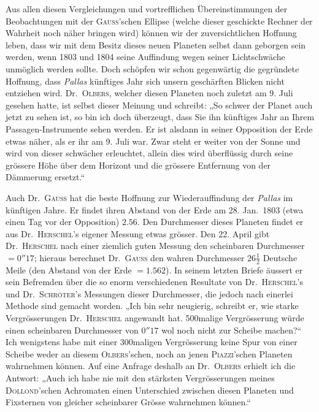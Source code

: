 Aus allen diesen Vergleichungen und vortrefflichen Übereinstimmungen der Beobachtungen mit der \textsc{Gauss}'schen Ellipse (welche dieser geschickte Rechner der Wahrheit noch näher bringen wird) können wir der zuversichtlichen Hoffnung leben, dass wir mit dem Besitz dieses neuen Planeten selbst dann geborgen sein werden, wenn 1803 und 1804 seine Auffindung wegen seiner Lichtschwäche unmöglich werden sollte. Doch schöpfen wir schon gegenwärtig die gegründete Hoffnung, dass \textit{Pallas} künftiges Jahr sich unsern geschärften Blicken nicht entziehen wird. Dr.\ \textsc{Olbers}, welcher diesen Planeten noch zuletzt am 9. Juli gesehen hatte, ist selbst dieser Meinung und schreibt: „So schwer der Planet auch jetzt zu sehen ist, so bin ich doch überzeugt, dass Sie ihn künftiges Jahr an Ihrem Passagen-Instrumente sehen werden. Er ist alsdann in seiner Opposition der Erde etwas näher, als er ihr am 9. Juli war. Zwar steht er weiter von der Sonne und wird von dieser schwächer erleuchtet, allein dies wird überflüssig durch seine grössere Höhe über dem Horizont und die grössere Entfernung von der Dämmerung ersetzt.“

Auch Dr.\ \textsc{Gauss} hat die beste Hoffnung zur Wiederauffindung der \textit{Pallas} im künftigen Jahre. Er findet ihren Abstand von der Erde am 28. Jan.\ 1803 (etwa einen Tag vor der Opposition) $2.56$. Den Durchmesser dieses Planeten findet er aus Dr.\ \textsc{Herschel}'s eigener Messung etwas grösser. Den 22. April gibt Dr.\ \textsc{Herschel} nach einer ziemlich guten Messung den scheinbaren Durchmesser $=0''17$; hieraus berechnet Dr.\ \textsc{Gauss} den wahren Durchmesser $26\frac{1}{2}$ Deutsche Meile (den Abstand von der Erde $=1.562$). In seinem letzten Briefe äussert er sein Befremden über die so enorm verschiedenen Resultate von Dr.\ \textsc{Herschel}'s und Dr.\ \textsc{Schröter}'s Messungen dieser Durchmesser, die jedoch nach einerlei Methode sind gemacht worden. „Ich bin sehr neugierig, schreibt er, wie starke Vergrösserungen Dr.\ \textsc{Herschel} angewandt hat. 500malige Vergrösserung würde einen scheinbaren Durchmesser von $0''17$ wol noch nicht zur Scheibe machen?“ Ich wenigstens habe mit einer 300maligen Vergrösserung keine Spur von einer Scheibe weder an diesem \textsc{Olbers}'schen, noch an jenen \textsc{Piazzi}'schen Planeten wahrnehmen können. Auf eine Anfrage deshalb an Dr.\ \textsc{Olbers} erhielt ich die Antwort: „Auch ich habe nie mit den stärksten Vergrösserungen meines \textsc{Dollond}'schen Achromaten einen Unterschied zwischen diesen Planeten und Fixsternen von gleicher scheinbarer Grösse wahrnehmen können.“

